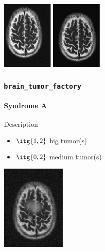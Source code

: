 \documentclass[]{beamer}
\newcommand{\btf}{\tt{brain\_tumor\_factory}}
\begin{document}
\begin{frame}
\begin{minipage}{\linewidth}
\begin{center}
      \includegraphics[width=2.55cm]{resources/z7}
      \includegraphics[width=2.55cm]{resources/z8}
    \end{center}
  \end{minipage}
\end{frame}

\begin{frame}
  \frametitle{\btf}
  \framesubtitle{Syndrome A}
  \begin{block}{Description}
    \begin{itemize}
      \item \alert{$\itg{1, 2}$} big tumor(s)
      \item \alert{$\itg{0, 2}$} medium tumor(s)
    \end{itemize}
  \end{block}
  \begin{center}
    \includegraphics[width=3.2cm]{resources/a1e}
  \end{center}
\end{frame}
\end{document}
